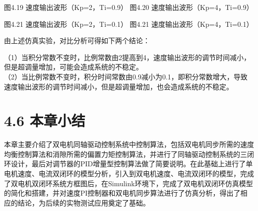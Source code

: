 \documentclass[UTF8,zihao=-4,openany,oneside]{ctexbook}
\begin{document}
\begin{center}
\end{center}
\begin{center}
\end{center}

\begin{center}图4.19 速度输出波形（Kp=2，Ti=0.9） 图4.20 速度输出波形（Kp=4，Ti=0.9）\end{center}

\begin{center}
\end{center}
\begin{center}
\end{center}

\begin{center}图4.21 速度输出波形（Kp=2，Ti=0.1） 图4.21 速度输出波形（Kp=4，Ti=0.1）\end{center}

由上述仿真实验，对比分析可得如下两个结论：

\noindent （1）当积分常数不变时，比例常数由2提高到4，速度输出波形的调节时间减小，但是超调量增加，可能会造成系统的不稳定。\\

\noindent （2）当比例常数不变时，积分时间常数由0.9减小为0.1，即积分常数增大，导致速度输出波形的调节时间减小，但是超调量增加，也会造成系统的不稳定。\\

\section{4.6 本章小结}

本章主要介绍了双电机同轴驱动控制系统中控制算法，包括双电机同步所需的速度均衡控制算法和消隙所需的偏置力矩控制算法，并进行了同轴驱动控制系统的三闭环设计，最后对调节器的PID增量型控制算法做了简要说明。在此基础上进行了单电机速度、电流双闭环的模型分析，引入到双电机速度、电流双闭环的模型，完成了双电机双闭环系统方框图后，在Simulink环境下，完成了双电机双闭环仿真模型的简化和搭建，并对速度PI控制器和双电机同步算法进行了仿真分析，得出了相应的结论，为后续的实物测试应用奠定了基础。
\end{document}
